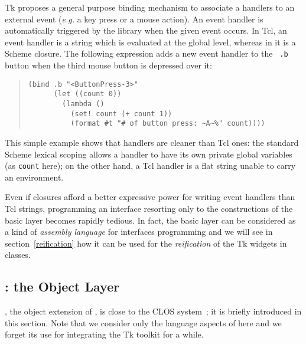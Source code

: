 {Tk proposes a general purpose binding mechanism to associate 
a handlers to an external event ({\em e.g.} a key press or a mouse
action). An event handler is automatically triggered by the library
when the given event occurs. In Tcl, an event handler is a string which is
evaluated at the global level, whereas in {\stk} it is a Scheme
closure. The following expression adds a new event handler to the {\tt
.b} button when the third mouse button is depressed over it:
\begin{quote}\figsize
\begin{verbatim}
(bind .b "<ButtonPress-3>"
      (let ((count 0))
        (lambda ()
          (set! count (+ count 1))
          (format #t "# of button press: ~A~%" count))))
\end{verbatim}
\end{quote}

This simple example shows that {\stk} handlers are cleaner than Tcl ones: 
the standard Scheme lexical scoping allows a handler to have its own
private global variables (as {\tt count} here); on the other hand, a Tcl
handler is a flat string unable to carry an environment.

Even if closures afford a better expressive power for writing event
handlers than Tcl strings, programming an interface resorting only to the
constructions of the basic layer becomes rapidly tedious. In fact, the
{\stk} basic layer can be considered as a kind of {\em assembly language}
for interfaces programming and we will see in section~\ref{reification} how
it can be used for the {\em reification} of the Tk widgets in {\stklos}
classes.


\subsection{\stk: the Object Layer}

{\stklos}, the object extension of {\stk}, is close to the CLOS
system~\cite{CLOS}; it is briefly introduced in this section. Note that we
consider only the language aspects of {\stklos} here and we 
forget its use for integrating the Tk toolkit for a while.


}
